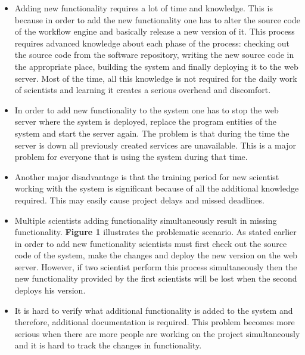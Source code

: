 \begin{itemize}

	\item Adding new functionality requires a lot of time and knowledge. This is because in order to add the new functionality one has to alter the source code of the workflow engine and basically release a new version of it. This process requires advanced knowledge about each phase of the process: checking out the source code from the software repository, writing the new source code in the appropriate place, building the system and finally deploying it to the web server. Most of the time, all this knowledge is not required for the daily work of scientists and learning it creates a serious overhead and discomfort.
	
	\item In order to add new functionality to the system one has to stop the web server where the system is deployed, replace the program entities of the system and start the server again. The problem is that during the time the server is down all previously created services are unavailable. This is a major problem for everyone that is using the system during that time.
	
	\item Another major disadvantage is that the training period for new scientist working with the system is significant because of all the additional knowledge required. This may easily cause project delays and missed deadlines.
	
	\item Multiple scientists adding functionality simultaneously result in missing functionality. \textbf{Figure 1} illustrates the problematic scenario. As stated earlier in order to add new functionality scientists must first check out the source code of the system, make the changes and deploy the new version on the web server. However, if two scientist perform this process simultaneously then the new functionality provided by the first scientists will be lost when the second deploys his version. 
	
	\item It is hard to verify what additional functionality is added to the system and therefore, additional documentation is required. This problem becomes more serious when there are more people are working on the project simultaneously and it is hard to track the changes in functionality.
		
\end{itemize}


